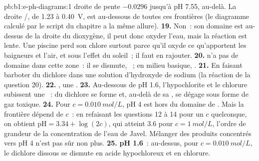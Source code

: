 \begin{solution}{pb:b1:e-ph-diagrams:1}
droite de pente
$-0.0296$ jusqu'à pH 7.55,  au-delà. La droite
/, de 1.23 à 0.40~V, est au-dessous de toutes ces
frontières (le diagramme calculé par le script du chapitre a la même
allure).
\textbf{19.} Non~: son domaine est au-dessus de la droite du dioxygène,
il peut donc oxyder l'eau, mais la réaction est lente. Une piscine perd
son chlore surtout parce qu'il oxyde ce qu'apportent les baigneurs et
l'air, et sous l'effet du soleil~; il faut en rajouter.
\textbf{20.}  n'a pas de domaine dans cette zone~: il se dismute,
~; en milieu basique,
.
\textbf{21.} En faisant barboter du dichlore dans une solution
d'hydroxyde de sodium (la réaction de la question 20).
\textbf{22.} , une .
\textbf{23.} Au-dessous de pH 1.6, l'hypochlorite et le chlorure
subissent une ~: du dichlore se forme et, au-delà de sa
, se dégage sous forme de gaz toxique.
\textbf{24.} Pour $c = \qty{0.010}{mol/L}$, pH 4 est hors du domaine de
. Mais la frontière dépend de $c$~: en refaisant les questions
12 à 14 pour un $c$ quelconque, on obtient
$\mathrm{pH} = 3.34 + \log(2c)$, qui atteint 3.6 pour
$c = \qty{1}{mol/L}$, l'ordre de grandeur de la concentration de l'eau
de Javel. Mélanger des produits concentrés vers pH 4 n'est pas sûr non
plus.
\textbf{25.} \textbf{pH 1.6}~: au-dessus, pour $c = \qty{0.010}{mol/L}$,
le dichlore dissous se dismute en acide hypochloreux et en chlorure.
\end{solution}
